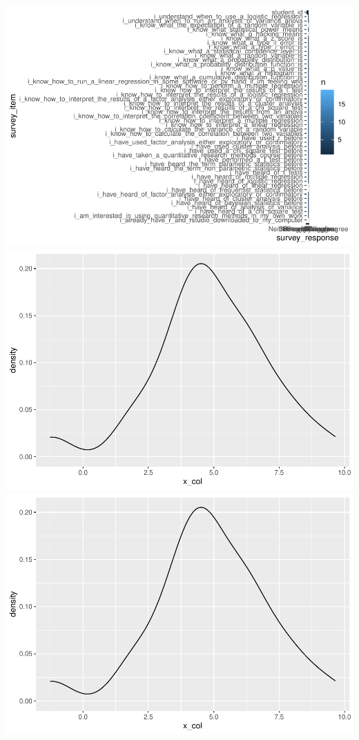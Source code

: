 \documentclass[
]{book}
\begin{document}
\includegraphics{test_course_notes_files/figure-latex/unnamed-chunk-15-1.pdf} \includegraphics{test_course_notes_files/figure-latex/unnamed-chunk-15-2.pdf} \includegraphics{test_course_notes_files/figure-latex/unnamed-chunk-15-3.pdf}
\end{document}
